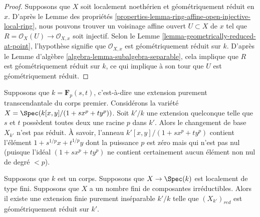 \begin{proof}
Supposons que $X$ soit localement noethérien et
géométriquement réduit en $x$. D'après le Lemme des
propriétés
\ref{properties-lemma-ring-affine-open-injective-local-ring}, nous
pouvons trouver un voisinage affine ouvert $U \subset X$ de $x$
tel que $R = \mathcal{O}_X(U) \to \mathcal{O}_{X, x}$ soit
injectif. Selon le Lemme \ref{lemma-geometrically-reduced-at-point},
l'hypothèse signifie que $\mathcal{O}_{X, x}$ est géométriquement
réduit sur $k$. D'après le Lemme d'algèbre
\ref{algebra-lemma-subalgebra-separable}, cela implique que $R$ est
géométriquement réduit sur $k$, ce qui implique à son tour que $U$ est géométriquement réduit.
\end{proof}

\begin{example}
\label{example-not-geometrically-reduced}
Supposons que $k = \mathbf{F}_p(s, t)$, c’est-à-dire une
extension purement transcendantale du corps premier.
Considérons la variété $X = \Spec(k[x, y]/(1 + sx^p +
ty^p))$. Soit $k'/k$ une extension quelconque telle que $s$
et $t$ possèdent toutes deux une racine $p$ dans $k'$.
Alors le changement de base $X_{k'}$ n’est pas réduit. À
savoir, l’anneau $k'[x, y]/(1 + s x^p + ty^p)$ contient
l’élément $1 + s^{1/p}x + t^{1/p}y$ dont la puissance $p$ est
zéro mais qui n’est pas nul (puisque l’idéal $(1 + sx^p + ty^p)$
ne contient certainement aucun élément non nul de degré $< p$).
\end{example}

\begin{lemma}
\label{lemma-finite-extension-geometrically-reduced}
Supposons que $k$ est un corps. Supposons que $X \to
\Spec(k)$ est localement de type fini. Supposons que $X$ a
un nombre fini de composantes irréductibles. Alors il
existe une extension finie purement inséparable $k'/k$
telle que $(X_{k'})_{red}$ est géométriquement réduit sur $k'$.
\end{lemma}

